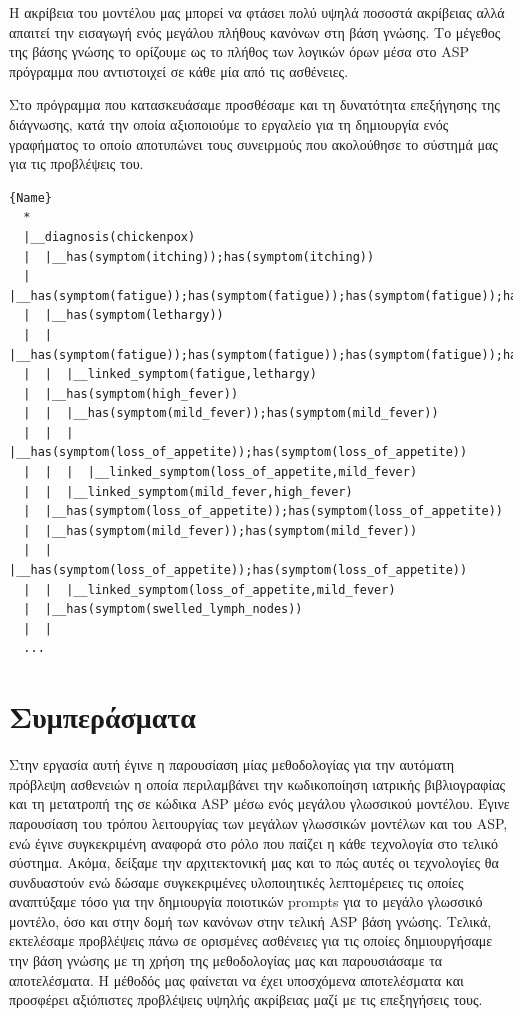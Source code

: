 \documentclass[10pt,leqno]{amsart}
\begin{document}
Η ακρίβεια του μοντέλου μας μπορεί να φτάσει πολύ υψηλά ποσοστά ακρίβειας αλλά απαιτεί την εισαγωγή ενός μεγάλου πλήθους κανόνων στη βάση γνώσης.
Το μέγεθος της βάσης γνώσης το ορίζουμε ως το πλήθος των λογικών όρων μέσα 
στο ASP πρόγραμμα που αντιστοιχεί σε κάθε μία από τις ασθένειες.

Στο πρόγραμμα που κατασκευάσαμε προσθέσαμε και τη δυνατότητα 
επεξήγησης της διάγνωσης, κατά την οποία αξιοποιούμε 
το εργαλείο  για τη δημιουργία ενός γραφήματος
το οποίο αποτυπώνει τους συνειρμούς που ακολούθησε το σύστημά 
μας για τις προβλέψεις του.

\begin{lstlisting}[caption={Μέρος της επεξήγησης για τη διάγνωση της ασθένειας chickenpox. Μέσα στο διάγραμμα δέντρο φαίνονται οι συσχετίσεις μεταξύ των διαφορετικών συμπτωμάτων 
και το πώς το σύστημά μας καταλήγει στα συμπεράσματά του.}, label=lst:terms]{Name}
  *
  |__diagnosis(chickenpox)
  |  |__has(symptom(itching));has(symptom(itching))
  |  |__has(symptom(fatigue));has(symptom(fatigue));has(symptom(fatigue));has(symptom(fatigue));has(symptom(fatigue))
  |  |__has(symptom(lethargy))
  |  |  |__has(symptom(fatigue));has(symptom(fatigue));has(symptom(fatigue));has(symptom(fatigue));has(symptom(fatigue))
  |  |  |__linked_symptom(fatigue,lethargy)
  |  |__has(symptom(high_fever))
  |  |  |__has(symptom(mild_fever));has(symptom(mild_fever))
  |  |  |  |__has(symptom(loss_of_appetite));has(symptom(loss_of_appetite))
  |  |  |  |__linked_symptom(loss_of_appetite,mild_fever)
  |  |  |__linked_symptom(mild_fever,high_fever)
  |  |__has(symptom(loss_of_appetite));has(symptom(loss_of_appetite))
  |  |__has(symptom(mild_fever));has(symptom(mild_fever))
  |  |  |__has(symptom(loss_of_appetite));has(symptom(loss_of_appetite))
  |  |  |__linked_symptom(loss_of_appetite,mild_fever)
  |  |__has(symptom(swelled_lymph_nodes))
  |  |  
  ...
\end{lstlisting}

\section{Συμπεράσματα}

Στην εργασία αυτή έγινε η παρουσίαση μίας μεθοδολογίας για την αυτόματη πρόβλεψη ασθενειών 
η οποία περιλαμβάνει την κωδικοποίηση ιατρικής βιβλιογραφίας και τη μετατροπή της σε κώδικα 
ASP μέσω ενός μεγάλου γλωσσικού μοντέλου.
Έγινε παρουσίαση του τρόπου λειτουργίας των μεγάλων γλωσσικών μοντέλων και του ASP, 
ενώ έγινε συγκεκριμένη αναφορά στο ρόλο που παίζει η κάθε τεχνολογία στο τελικό σύστημα.
Ακόμα, δείξαμε την αρχιτεκτονική μας και το πώς αυτές οι τεχνολογίες θα συνδυαστούν ενώ
δώσαμε συγκεκριμένες υλοποιητικές λεπτομέρειες τις οποίες αναπτύξαμε τόσο
για την δημιουργία ποιοτικών prompts για το μεγάλο γλωσσικό μοντέλο, όσο και
στην δομή των κανόνων στην τελική ASP βάση γνώσης.
Τελικά, εκτελέσαμε προβλέψεις πάνω σε ορισμένες ασθένειες για τις οποίες δημιουργήσαμε την
βάση γνώσης με τη χρήση της μεθοδολογίας μας και παρουσιάσαμε τα αποτελέσματα.
Η μέθοδός μας φαίνεται να έχει υποσχόμενα αποτελέσματα και προσφέρει αξιόπιστες προβλέψεις υψηλής ακρίβειας
μαζί με τις επεξηγήσεις τους.
\end{document}
